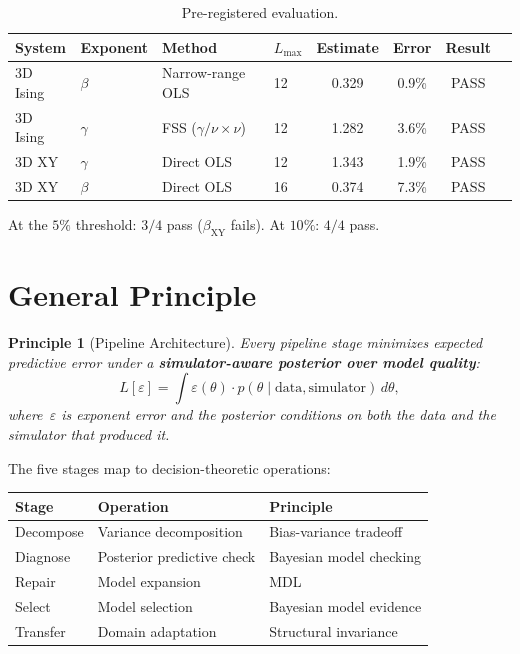\documentclass[11pt,a4paper]{article}
\newtheorem{principle}[theorem]{Principle}
\begin{document}
\begin{table}[ht]
\centering
\caption{Pre-registered evaluation.}
\label{tab:prereg}
\begin{tabular}{@{}llllcccl@{}}
\toprule
System & Exponent & Method & $L_{\max}$ & Estimate & Error & Result \\
\midrule
3D Ising & $\beta$ & Narrow-range OLS & 12 & 0.329 & 0.9\% & PASS \\
3D Ising & $\gamma$ & FSS ($\gamma/\nu \times \nu$) & 12 & 1.282 & 3.6\% & PASS \\
3D XY & $\gamma$ & Direct OLS & 12 & 1.343 & 1.9\% & PASS \\
3D XY & $\beta$ & Direct OLS & 16 & 0.374 & 7.3\% & PASS \\
\bottomrule
\end{tabular}
\end{table}

\noindent At the $5\%$ threshold: $3/4$ pass ($\beta_{\text{XY}}$ fails). At $10\%$: $4/4$ pass.

\section{General Principle}\label{sec:principle}

\begin{principle}[Pipeline Architecture]
Every pipeline stage minimizes expected predictive error under a \textbf{simulator-aware posterior over model quality}:
\[
  L[\varepsilon] = \int \varepsilon(\theta)\cdot p(\theta \mid \text{data}, \text{simulator})\,d\theta,
\]
where~$\varepsilon$ is exponent error and the posterior conditions on both the data and the simulator that produced it.
\end{principle}

The five stages map to decision-theoretic operations:
\begin{center}
\begin{tabular}{@{}lll@{}}
\toprule
Stage & Operation & Principle \\
\midrule
Decompose & Variance decomposition & Bias-variance tradeoff \\
Diagnose & Posterior predictive check & Bayesian model checking \\
Repair & Model expansion & MDL \\
Select & Model selection & Bayesian model evidence \\
Transfer & Domain adaptation & Structural invariance \\
\bottomrule
\end{tabular}
\end{center}
\end{document}
